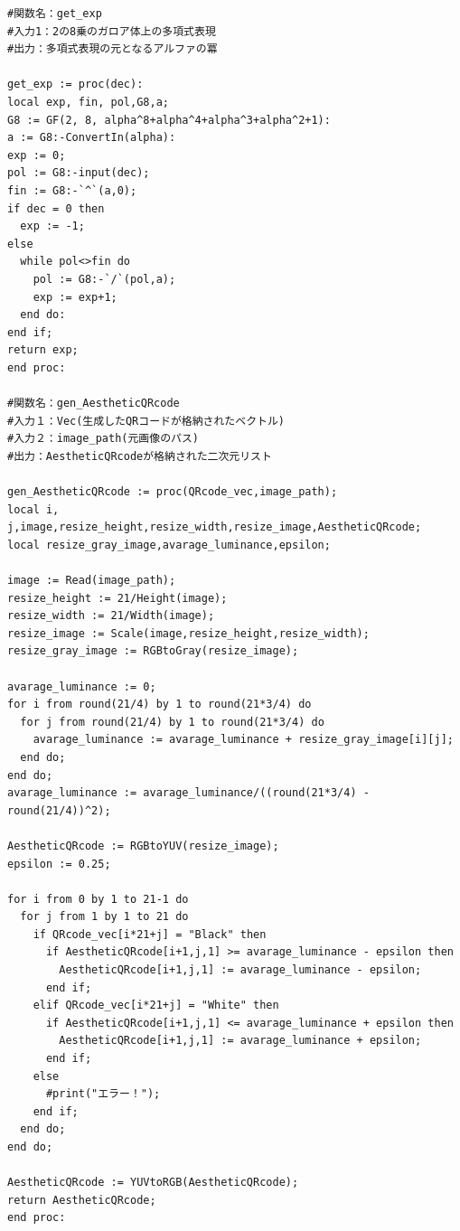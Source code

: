 \documentclass{thesis}
\begin{document}
\begin{lstlisting}
#関数名：get_exp
#入力1：2の8乗のガロア体上の多項式表現
#出力：多項式表現の元となるアルファの冪

get_exp := proc(dec):
local exp, fin, pol,G8,a;
G8 := GF(2, 8, alpha^8+alpha^4+alpha^3+alpha^2+1):
a := G8:-ConvertIn(alpha):
exp := 0;
pol := G8:-input(dec);
fin := G8:-`^`(a,0);
if dec = 0 then
  exp := -1;
else
  while pol<>fin do
    pol := G8:-`/`(pol,a);
    exp := exp+1;
  end do:
end if;
return exp;
end proc:

#関数名：gen_AestheticQRcode
#入力１：Vec(生成したQRコードが格納されたベクトル)
#入力２：image_path(元画像のパス)
#出力：AestheticQRcodeが格納された二次元リスト

gen_AestheticQRcode := proc(QRcode_vec,image_path);
local i, j,image,resize_height,resize_width,resize_image,AestheticQRcode;
local resize_gray_image,avarage_luminance,epsilon;
  
image := Read(image_path);
resize_height := 21/Height(image);
resize_width := 21/Width(image);
resize_image := Scale(image,resize_height,resize_width); 
resize_gray_image := RGBtoGray(resize_image);

avarage_luminance := 0;
for i from round(21/4) by 1 to round(21*3/4) do
  for j from round(21/4) by 1 to round(21*3/4) do
    avarage_luminance := avarage_luminance + resize_gray_image[i][j];
  end do;
end do;
avarage_luminance := avarage_luminance/((round(21*3/4) - round(21/4))^2);

AestheticQRcode := RGBtoYUV(resize_image);
epsilon := 0.25;

for i from 0 by 1 to 21-1 do
  for j from 1 by 1 to 21 do
    if QRcode_vec[i*21+j] = "Black" then
      if AestheticQRcode[i+1,j,1] >= avarage_luminance - epsilon then
        AestheticQRcode[i+1,j,1] := avarage_luminance - epsilon;
      end if;
    elif QRcode_vec[i*21+j] = "White" then
      if AestheticQRcode[i+1,j,1] <= avarage_luminance + epsilon then
        AestheticQRcode[i+1,j,1] := avarage_luminance + epsilon;
      end if;
    else
      #print("エラー！");
    end if;
  end do;
end do;

AestheticQRcode := YUVtoRGB(AestheticQRcode);
return AestheticQRcode;
end proc:



\end{lstlisting}
\end{document}
